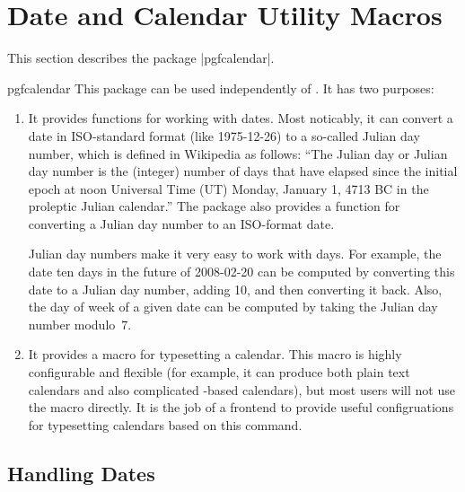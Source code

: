 %
%
%


\section{Date and Calendar Utility Macros}
\label{section-calendar}

This section describes the package |pgfcalendar|.

\begin{package}{pgfcalendar}
  This package can be used independently of \pgfname. It has two
  purposes:
  \begin{enumerate}
  \item It provides functions for working with dates. Most noticably,
    it can convert a date in ISO-standard format (like 1975-12-26) to
    a so-called Julian day number, which is defined in Wikipedia as
    follows:  ``The Julian day or Julian day number is the
    (integer) number of days that have elapsed since the initial epoch
    at noon Universal Time (UT) Monday, January 1, 4713 BC in the
    proleptic Julian calendar.'' The package also provides a function
    for converting a Julian day number to an ISO-format date.

    Julian day numbers make it very easy to work with days. For
    example, the date ten days in the future of 2008-02-20 can
    be computed by converting this date to a Julian day number, adding
    10, and then converting it back. Also, the day of week of a given
    date can be computed by taking the Julian day number modulo~7.
  \item It provides a macro for typesetting a calendar. This macro
    is highly configurable and flexible (for example, it can produce
    both plain text calendars and also complicated \tikzname-based
    calendars), but most users will not use the macro directly. It is
    the job of a frontend to provide useful configruations for
    typesetting calendars based on this command.
  \end{enumerate}
\end{package}


\subsection{Handling Dates}

